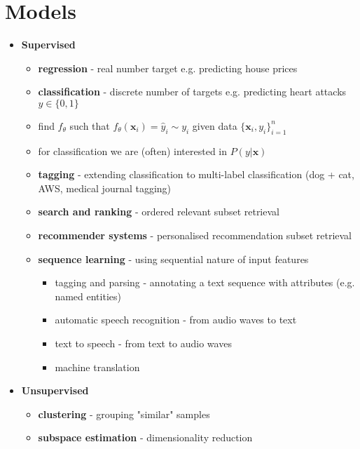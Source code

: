 \documentclass[12pt,notitlepage]{article}
\begin{document}
\section{Models}

\begin{itemize}
    \item \textbf{Supervised}
          \begin{itemize}
              \item \textbf{regression} - real number target e.g. predicting house prices
              \item \textbf{classification} - discrete number of targets e.g. predicting heart attacks $y \in \{0,1\}$
              \item find $f_{\theta}$ such that $f_{\theta}(\textbf{x}_i) = \hat{y}_i\sim y_i$ given data $\{\textbf{x}_i,y_i\}^n_{i=1} $
              \item for classification we are (often) interested in $P(y|\textbf{x})$
              \item \textbf{tagging} - extending classification to multi-label classification (dog + cat, AWS, medical journal tagging)
              \item \textbf{search and ranking} - ordered relevant subset retrieval
              \item \textbf{recommender systems} - personalised recommendation subset retrieval
              \item \textbf{sequence learning} - using sequential nature of input features
                    \begin{itemize}
                        \item tagging and parsing - annotating a text sequence with attributes (e.g. named entities)
                        \item automatic speech recognition - from audio waves to text
                        \item text to speech - from text to audio waves
                        \item machine translation
                    \end{itemize}
          \end{itemize}
    \item \textbf{Unsupervised}
          \begin{itemize}
              \item \textbf{clustering} - grouping "similar" samples
              \item \textbf{subspace estimation} - dimensionality reduction

\end{itemize}
\end{itemize}
\end{document}
